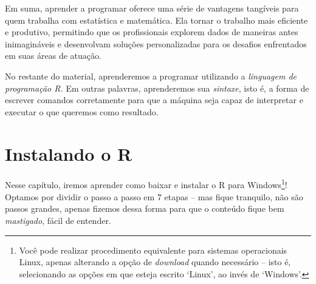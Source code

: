 \documentclass[
  letterpaper,
  DIV=11,
  numbers=noendperiod]{scrreprt}
\begin{document}
Em suma, aprender a programar oferece uma série de vantagens tangíveis
para quem trabalha com estatística e matemática. Ela tornar o trabalho
mais eficiente e produtivo, permitindo que os profissionais explorem
dados de maneiras antes inimagináveis e desenvolvam soluções
personalizadas para os desafios enfrentados em suas áreas de atuação.

No restante do material, aprenderemos a programar utilizando a
\emph{linguagem de programação R.} Em outras palavras, aprenderemos sua
\emph{sintaxe}, isto é, a forma de escrever comandos corretamente para
que a máquina seja capaz de interpretar e executar o que queremos como
resultado.


\chapter{Instalando o R}\label{instalando-o-r}

Nesse capítulo, iremos aprender como baixar e instalar o R para
Windows\footnote{Você pode realizar procedimento equivalente para
  sistemas operacionais Linux, apenas alterando a opção de
  \emph{download} quando necessário -- isto é, selecionando as opções em
  que esteja escrito `Linux', ao invés de `Windows'.}! Optamos por
dividir o passo a passo em 7 etapas -- mas fique tranquilo, não são
passos grandes, apenas fizemos dessa forma para que o conteúdo fique bem
\emph{mastigado}, fácil de entender.
\end{document}
